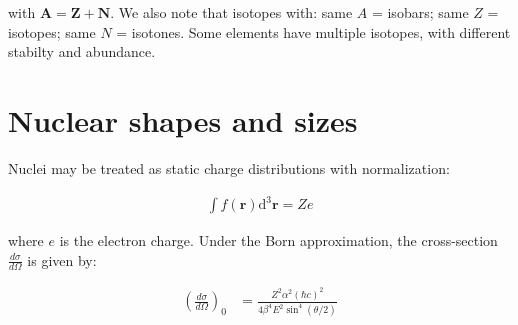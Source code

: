 \documentclass[10pt]{article}
\theoremstyle{definition}
\begin{document}
with $\mathbf{A = Z+N}$. We also note that isotopes with: same $A$ = isobars; same $Z$ = isotopes; same $N$ = isotones. Some elements have multiple isotopes, with different stabilty and abundance.

\section*{Nuclear shapes and sizes}%

Nuclei may be treated as static charge distributions with normalization:

\begin{align*}
    \int f(\mathbf{r})\text{d}^3\mathbf{r} = Ze
\end{align*}

where $e$ is the electron charge. Under the Born approximation, the cross-section $\frac{d\sigma}{d\Omega}$ is given by:

\begin{align*}
    \left(\frac{d\sigma}{d\Omega}\right)_0 &= 
    \frac{Z^2 \alpha^2 (\hbar c)^2}{4\beta^4 E^2 \sin^4(\theta/2)}
\end{align*}
\end{document}
